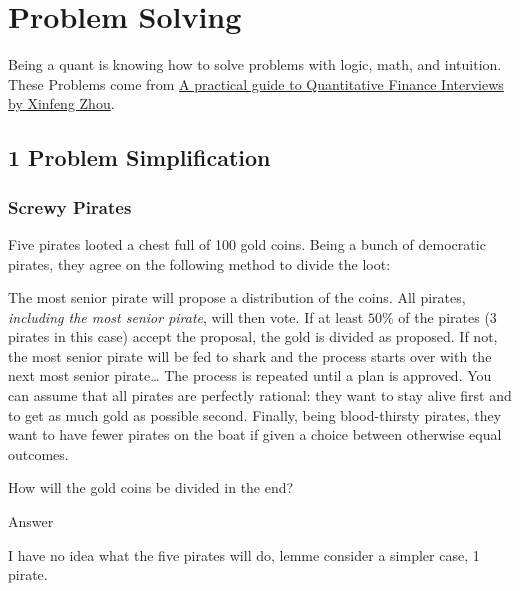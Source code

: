 \documentclass[
  letterpaper,
  DIV=11,
  numbers=noendperiod]{scrreprt}
\begin{document}

\chapter*{Problem Solving}\label{problem-solving}


Being a quant is knowing how to solve problems with logic, math, and
intuition. These Problems come from
\href{https://academyflex.com/wp-content/uploads/2024/03/a-practical-guide-to-quantitative-finance-interviews.pdf}{A
practical guide to Quantitative Finance Interviews by Xinfeng Zhou}.

\section*{1 Problem Simplification}\label{problem-simplification}


\subsection*{Screwy Pirates}\label{screwy-pirates}

Five pirates looted a chest full of 100 gold coins. Being a bunch of
democratic pirates, they agree on the following method to divide the
loot:

The most senior pirate will propose a distribution of the coins. All
pirates, \emph{including the most senior pirate}, will then vote. If at
least \(50\%\) of the pirates (\(3\) pirates in this case) accept the
proposal, the gold is divided as proposed. If not, the most senior
pirate will be fed to shark and the process starts over with the next
most senior pirate\ldots{} The process is repeated until a plan is
approved. You can assume that all pirates are perfectly rational: they
want to stay alive first and to get as much gold as possible second.
Finally, being blood-thirsty pirates, they want to have fewer pirates on
the boat if given a choice between otherwise equal outcomes.

How will the gold coins be divided in the end?

Answer

I have no idea what the five pirates will do, lemme consider a simpler
case, 1 pirate.
\end{document}
